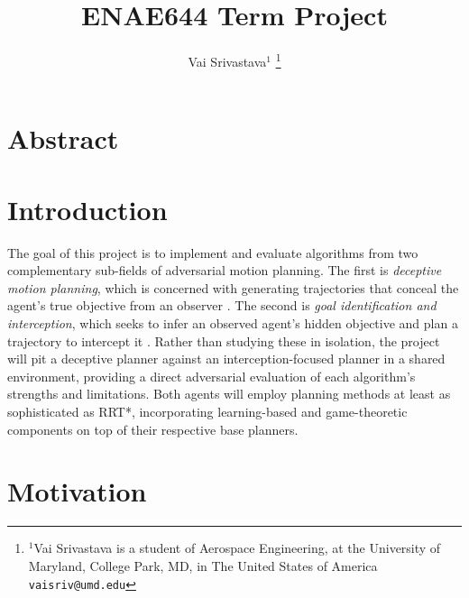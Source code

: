 \documentclass[letterpaper, 10pt, conference]{ieeeconf}
\title{{\LARGE \textbf{ENAE644 Term Project}}}
\author{Vai Srivastava\( ^{1} \)
   \thanks{
      \( ^{1} \)Vai Srivastava is a student of Aerospace Engineering,
      at the University of Maryland, College Park, MD, in The United States of America
      {\tt\small vaisriv@umd.edu}
   }
}
\begin{document}
\maketitle
\thispagestyle{empty}
\pagestyle{empty}


\section{Abstract} \label{sec:abstract}

\lipsum[1-2]

\section{Introduction} \label{sec:introduction}

The goal of this project is to implement and evaluate algorithms from two complementary sub-fields of adversarial motion planning. The first is \emph{deceptive motion planning}, which is concerned with generating trajectories that conceal the agent's true objective from an observer \cite{nichols2022adversarial, xu2020single}. The second is \emph{goal identification and interception}, which seeks to infer an observed agent's hidden objective and plan a trajectory to intercept it \cite{zeng2023recognition, tastan2012learning}. Rather than studying these in isolation, the project will pit a deceptive planner against an interception-focused planner in a shared environment, providing a direct adversarial evaluation of each algorithm's strengths and limitations. Both agents will employ planning methods at least as sophisticated as RRT*, incorporating learning-based and game-theoretic components on top of their respective base planners.

\section{Motivation} \label{sec:motivation}
\end{document}
